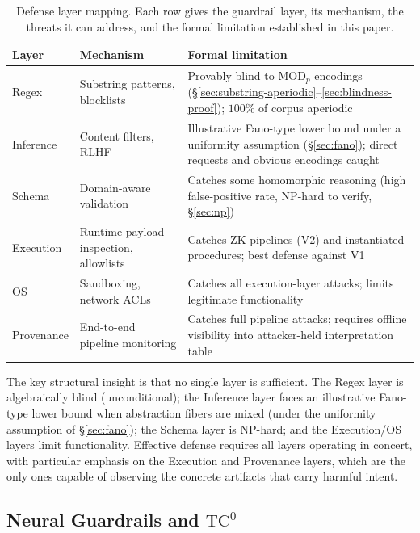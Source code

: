 \documentclass[letterpaper,twocolumn,10pt]{article}
\theoremstyle{definition}
\theoremstyle{remark}
\begin{document}
\begin{table}[t]
\centering
\caption{Defense layer mapping. Each row gives the guardrail layer, its mechanism,
the threats it can address, and the formal limitation established in this paper.}
\label{tab:defense}
\small
\begin{tabularx}{\columnwidth}{lXX}
\toprule
Layer & Mechanism & Formal limitation \\
\midrule
Regex & Substring patterns, blocklists & Provably blind to $\mathrm{MOD}_p$ encodings (\S\ref{sec:substring-aperiodic}--\ref{sec:blindness-proof}); $100\%$ of corpus aperiodic \\
Inference & Content filters, RLHF & Illustrative Fano-type lower bound under a uniformity assumption (\S\ref{sec:fano}); direct requests and obvious encodings caught \\
Schema & Domain-aware validation & Catches some homomorphic reasoning (high false-positive rate, NP-hard to verify, \S\ref{sec:np}) \\
Execution & Runtime payload inspection, allowlists & Catches ZK pipelines (V2) and instantiated procedures; best defense against V1 \\
OS & Sandboxing, network ACLs & Catches all execution-layer attacks; limits legitimate functionality \\
Provenance & End-to-end pipeline monitoring & Catches full pipeline attacks; requires offline visibility into attacker-held interpretation table \\
\bottomrule
\end{tabularx}
\end{table}

The key structural insight is that no single layer is sufficient.
The Regex layer is algebraically blind (unconditional); the Inference layer
faces an illustrative Fano-type lower bound when abstraction fibers are
mixed (under the uniformity assumption of \S\ref{sec:fano}); the Schema
layer is NP-hard; and the Execution/OS layers limit functionality.
Effective defense requires all layers operating in concert, with particular emphasis
on the Execution and Provenance layers, which are the only ones capable of observing
the concrete artifacts that carry harmful intent.

\subsection[Neural Guardrails and TC0]{Neural Guardrails and $\mathrm{TC}^0$}\label{sec:neural-tc0}
\end{document}
